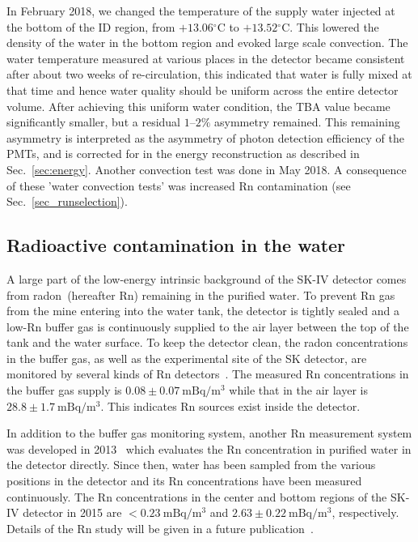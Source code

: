 \documentclass[aps,prd,reprint,superscriptaddress,floatfix,altaffilletter,nofootinbib]{revtex4-2}
\begin{document}
In February 2018, we changed the temperature of the supply water injected at the bottom of the ID region, from $+13.06\mathrm{^{\circ}C}$ to $+13.52\mathrm{^{\circ}C}$.
This lowered the density of the water in the bottom region  and evoked large scale convection. 
The water temperature measured at various places in the detector became consistent after about two weeks of re-circulation, 
this indicated that water is fully mixed at that time and hence water quality should be uniform across the entire detector volume.
After achieving this uniform water condition, the TBA value became significantly smaller, but a residual $1$--$2\%$ asymmetry remained. 
This remaining asymmetry is interpreted as the asymmetry of photon detection efficiency of the PMTs, and is corrected for in the energy reconstruction as described in Sec.~\ref{sec:energy}.
Another convection test was done in May 2018. 
A consequence of these 'water convection tests' was increased Rn contamination (see Sec.~\ref{sec_runselection}).


\subsection{Radioactive contamination in the water} \label{sec:radon}
A large part of the low-energy intrinsic background of the SK-IV detector comes from radon~(hereafter Rn) remaining in the purified water. 
To prevent Rn gas from the mine entering into the water tank, the detector is tightly sealed and a low-Rn buffer gas is continuously supplied to the air layer between the top of the tank and the water surface. 
To keep the detector clean, the radon concentrations in the buffer gas, as well as the experimental site of the SK detector, are monitored by several kinds of Rn detectors~\cite{Nakano:2017rsy, Pronost:2018ghn}. 
The measured Rn concentrations in the buffer gas supply is $0.08\pm0.07~\mathrm{mBq/m^{3}}$ while that in the air layer is $28.8\pm1.7~\mathrm{mBq/m^{3}}$. 
This indicates Rn sources exist inside the detector.

In addition to the buffer gas monitoring system, another Rn measurement system was developed in 2013~\cite{Nakano:2019bnr} which evaluates the Rn concentration in purified water in the detector directly.
Since then, water has been sampled from the various positions in the detector and its Rn concentrations have been measured continuously. 
The Rn concentrations in the center and bottom regions of the SK-IV detector in 2015 are $<0.23~\mathrm{mBq/m^{3}}$ and $2.63\pm0.22~\mathrm{mBq/m^{3}}$, respectively. 
Details of the Rn study will be given in a future publication~\cite{nakano2023}.
\end{document}
